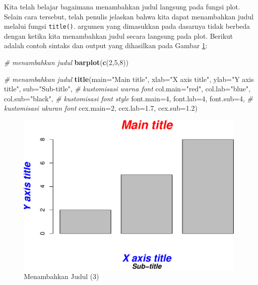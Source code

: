 \documentclass[]{book}
\newenvironment{Shaded}{\begin{snugshade}}{\end{snugshade}}
\newcommand{\KeywordTok}[1]{\textcolor[rgb]{0.13,0.29,0.53}{\textbf{#1}}}
\newcommand{\DataTypeTok}[1]{\textcolor[rgb]{0.13,0.29,0.53}{#1}}
\newcommand{\DecValTok}[1]{\textcolor[rgb]{0.00,0.00,0.81}{#1}}
\newcommand{\FloatTok}[1]{\textcolor[rgb]{0.00,0.00,0.81}{#1}}
\newcommand{\StringTok}[1]{\textcolor[rgb]{0.31,0.60,0.02}{#1}}
\newcommand{\CommentTok}[1]{\textcolor[rgb]{0.56,0.35,0.01}{\textit{#1}}}
\newcommand{\NormalTok}[1]{#1}
\begin{document}
Kita telah belajar bagaimana menambahkan judul langsung pada fungsi
plot. Selain cara tersebut, telah penulis jelaskan bahwa kita dapat
menambahkan judul melalui fungsi \texttt{title()}. argumen yang
dimasukkan pada dasarnya tidak berbeda dengan ketika kita menambahkan
judul secara langsung pada plot. Berikut adalah contoh sintaks dan
output yang dihasilkan pada Gambar \ref{fig:title3}:

\begin{Shaded}
\begin{Highlighting}[]
\CommentTok{# menambahkan judul}
\KeywordTok{barplot}\NormalTok{(}\KeywordTok{c}\NormalTok{(}\DecValTok{2}\NormalTok{,}\DecValTok{5}\NormalTok{,}\DecValTok{8}\NormalTok{))}

\CommentTok{# menambahkan judul}
\KeywordTok{title}\NormalTok{(}\DataTypeTok{main=}\StringTok{"Main title"}\NormalTok{,}
      \DataTypeTok{xlab=}\StringTok{"X axis title"}\NormalTok{,}
      \DataTypeTok{ylab=}\StringTok{"Y axis title"}\NormalTok{,}
      \DataTypeTok{sub=}\StringTok{"Sub-title"}\NormalTok{,}
      \CommentTok{# kustomisasi warna font}
      \DataTypeTok{col.main=}\StringTok{"red"}\NormalTok{, }
      \DataTypeTok{col.lab=}\StringTok{"blue"}\NormalTok{, }
      \DataTypeTok{col.sub=}\StringTok{"black"}\NormalTok{,}
      \CommentTok{# kustomisasi font style}
      \DataTypeTok{font.main=}\DecValTok{4}\NormalTok{, }
      \DataTypeTok{font.lab=}\DecValTok{4}\NormalTok{, }
      \DataTypeTok{font.sub=}\DecValTok{4}\NormalTok{,}
      \CommentTok{# kustomisasi ukuran font}
      \DataTypeTok{cex.main=}\DecValTok{2}\NormalTok{, }
      \DataTypeTok{cex.lab=}\FloatTok{1.7}\NormalTok{, }
      \DataTypeTok{cex.sub=}\FloatTok{1.2}\NormalTok{)}
\end{Highlighting}
\end{Shaded}

\begin{figure}

{\centering \includegraphics[width=0.7\linewidth]{EnvStat_files/figure-latex/title3-1} 

}

\caption{Menambahkan Judul (3)}\label{fig:title3}
\end{figure}
\end{document}
